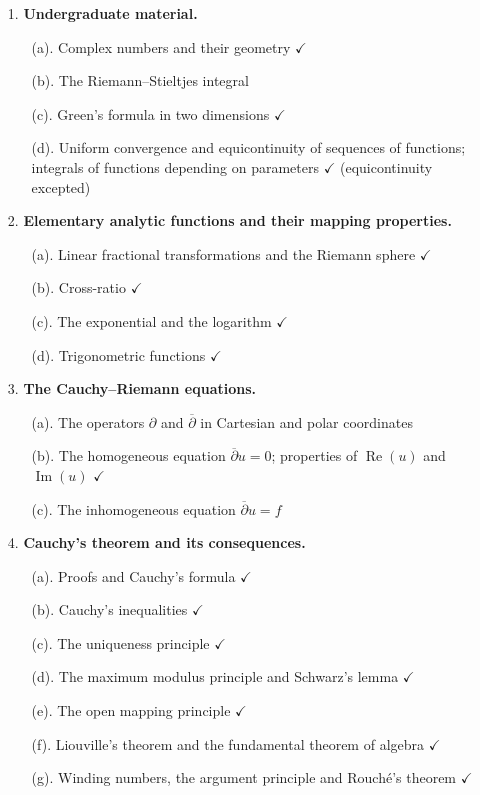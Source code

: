 \documentclass[11pt,a4paper]{article}
\theoremstyle{definition}
\begin{document}
\begin{enumerate}
\item[1.] \textbf{Undergraduate material.}
  \begin{enumerate}
  \item[(a).] Complex numbers and their geometry $\checkmark$
  \item[(b).] The Riemann--Stieltjes integral
  \item[(c).] Green's formula in two dimensions $\checkmark$
  \item[(d).] Uniform convergence and equicontinuity of sequences of functions;
  integrals of functions depending on parameters $\checkmark$ (equicontinuity
  excepted)
  \end{enumerate}

\item[2.] \textbf{Elementary analytic functions and their mapping properties.}
  \begin{enumerate}
  \item[(a).] Linear fractional transformations and the Riemann sphere $\checkmark$
  \item[(b).] Cross-ratio $\checkmark$
  \item[(c).] The exponential and the logarithm $\checkmark$
  \item[(d).] Trigonometric functions $\checkmark$
  \end{enumerate}

\item[3.] \textbf{The Cauchy--Riemann equations.}
  \begin{enumerate}
  \item[(a).] The operators $\partial$ and $\overline{\partial}$ in Cartesian and
  polar coordinates
  \item[(b).] The homogeneous equation $\overline{\partial}u = 0$; properties of
  $\operatorname{Re}(u)$ and $\operatorname{Im}(u)$ $\checkmark$
  \item[(c).] The inhomogeneous equation $\overline{\partial}u = f$
  \end{enumerate}

\item[4.] \textbf{Cauchy's theorem and its consequences.}
  \begin{enumerate}
  \item[(a).] Proofs and Cauchy's formula $\checkmark$
  \item[(b).] Cauchy's inequalities $\checkmark$
  \item[(c).] The uniqueness principle $\checkmark$
  \item[(d).] The maximum modulus principle and Schwarz's lemma $\checkmark$
  \item[(e).] The open mapping principle $\checkmark$
  \item[(f).] Liouville's theorem and the fundamental theorem of algebra $\checkmark$
  \item[(g).] Winding numbers, the argument principle and Rouch\'e's theorem $\checkmark$
  \end{enumerate}


\end{enumerate}
\end{document}

